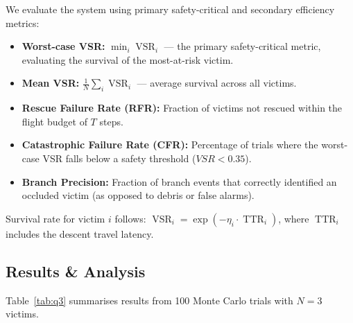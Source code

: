 \documentclass[11pt,a4paper]{article}
\begin{document}
We evaluate the system using primary safety-critical and secondary efficiency metrics:
\begin{itemize}
  \item \textbf{Worst-case VSR:} $\min_i \operatorname{VSR}_i$
        --- the primary safety-critical metric, evaluating the survival of the most-at-risk victim.
  \item \textbf{Mean VSR:} $\frac{1}{N}\sum_i \operatorname{VSR}_i$ --- average survival across all victims.
  \item \textbf{Rescue Failure Rate (RFR):} Fraction of victims not
        rescued within the flight budget of $T$ steps.
  \item \textbf{Catastrophic Failure Rate (CFR):} Percentage of trials where the worst-case VSR falls below a safety threshold ($VSR < 0.35$).
  \item \textbf{Branch Precision:} Fraction of branch events that
        correctly identified an occluded victim (as opposed to debris or false alarms).
\end{itemize}

Survival rate for victim $i$ follows: $\operatorname{VSR}_i = \exp(-\eta_i \cdot \operatorname{TTR}_i)$, where $\operatorname{TTR}_i$ includes the descent travel latency.

\subsection{Results & Analysis}
\label{sec:results}

Table~\ref{tab:q3} summarises results from 100 Monte Carlo trials with $N = 3$ victims.
\end{document}
